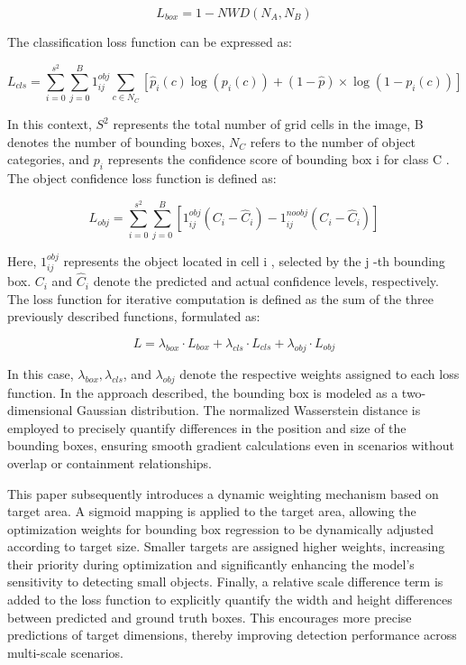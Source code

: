 \documentclass{article}
\begin{document}
\begin{equation*}
L_{b o x}=1-N W D\left(N_{A}, N_{B}\right) \tag{15}
\end{equation*}


The classification loss function can be expressed as:


\begin{equation*}
L_{c l s}=\sum_{i=0}^{s^{2}} \sum_{j=0}^{B} 1_{i j}^{o b j} \sum_{c \in N_{C}}\left[\hat{p}_{i}(c) \log \left(p_{i}(c)\right)+(1-\hat{p}) \times \log \left(1-p_{i}(c)\right)\right] \tag{16}
\end{equation*}


In this context, $S^{2}$ represents the total number of grid cells in the image, B denotes the number of bounding boxes, $N_{C}$ refers to the number of object categories, and $p_{i}$ represents the confidence score of bounding box i for class C . The object confidence loss function is defined as:


\begin{equation*}
L_{o b j}=\sum_{i=0}^{s^{2}} \sum_{j=0}^{B}\left[1_{i j}^{o b j}\left(C_{i}-\hat{C}_{i}\right)-1_{i j}^{n o o b j}\left(C_{i}-\hat{C}_{i}\right)\right] \tag{17}
\end{equation*}


Here, $1_{i j}^{o b j}$ represents the object located in cell i , selected by the j -th bounding box. $C_{i}$ and $\hat{C}_{i}$ denote the predicted and actual confidence levels, respectively. The loss function for iterative computation is defined as the sum of the three previously described functions, formulated as:


\begin{equation*}
L=\lambda_{b o x} \cdot L_{b o x}+\lambda_{c l s} \cdot L_{c l s}+\lambda_{o b j} \cdot L_{o b j} \tag{18}
\end{equation*}


In this case, $\lambda_{b o x}, \lambda_{c l s}$, and $\lambda_{o b j}$ denote the respective weights assigned to each loss function. In the approach described, the bounding box is modeled as a two-dimensional Gaussian distribution. The normalized Wasserstein distance is employed to precisely quantify differences in the position and size of the bounding boxes, ensuring smooth gradient calculations even in scenarios without overlap or containment relationships.

This paper subsequently introduces a dynamic weighting mechanism based on target area. A sigmoid mapping is applied to the target area, allowing the optimization weights for bounding box regression to be dynamically adjusted according to target size. Smaller targets are assigned higher weights, increasing their priority during optimization and significantly enhancing the model's sensitivity to detecting small objects. Finally, a relative scale difference term is added to the loss function to explicitly quantify the width and height differences between predicted and ground truth boxes. This encourages more precise predictions of target dimensions, thereby improving detection performance across multi-scale scenarios.
\end{document}
